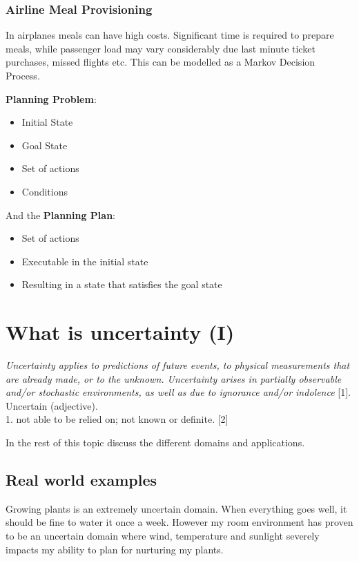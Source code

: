 \documentclass[runningheads,a4paper]{llncs}
\begin{document}
\subsubsection{Airline Meal Provisioning} In airplanes meals can have high
costs. Significant time is required to prepare meals, while passenger load
may vary considerably due last minute ticket purchases, missed flights etc.
This can be modelled as a Markov Decision Process.~\cite{goto2004coffee}


\noindent \textbf{Planning Problem}:

\begin{itemize}
	\item Initial State
	\item Goal State
	\item Set of actions
	\item Conditions
\end{itemize}

\noindent And the \textbf{Planning Plan}:

\begin{itemize}
	\item Set of actions
	\item Executable in the initial state
	\item Resulting in a state that satisfies the goal state
\end{itemize}

\section{What is uncertainty (I)}

\emph{Uncertainty applies to predictions of future events, to physical measurements that are already made, or to the unknown. Uncertainty arises in partially observable and/or stochastic environments, as well as due to ignorance and/or indolence} [1]. \\

Uncertain (adjective). \\
1. not able to be relied on; not known or definite. [2]

In the rest of this topic discuss the different domains and applications.

\subsection{Real world examples}

Growing plants is an extremely uncertain domain. When everything goes well, it should be fine to water it once a week. However my room environment has proven to be an uncertain domain where wind, temperature and sunlight severely impacts my ability to plan for nurturing my plants.
\end{document}
